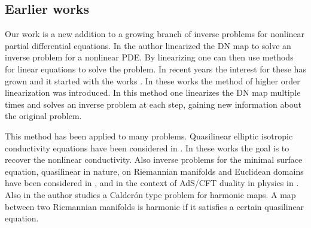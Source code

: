 \documentclass[a4paper, 10pt, twoside, notitlepage]{amsart}
\theoremstyle{plain}
\newcommand{\Om}{\Omega}
\numberwithin{equation}{section}
\begin{document}


\subsection{Earlier works}

Our work is a new addition to a growing branch of inverse problems for nonlinear partial differential equations. In \cite{isakov1993uniqueness} the author linearized the DN map to solve an inverse problem for a nonlinear PDE. By linearizing one can then use methods for linear equations to solve the problem. In recent years the interest for these has grown and it started with the works \cite{kurylev2018inverse,FO19,LLLS2019inverse}. In these works the method of higher order linearization was introduced. In this method one linearizes the DN map multiple times and solves an inverse problem at each step, gaining new information about the original problem.

This method has been applied to many problems. Quasilinear elliptic isotropic conductivity equations have been considered in \cite{CFKKU, kian2020partial, liimatainen2023calder}. In these works the goal is to recover the nonlinear conductivity. Also inverse problems for the minimal surface equation, quasilinear in nature, on Riemannian manifolds and Euclidean domains have been considered in \cite{ABN_20_minimal,carstea2024calderonproblemriemanniansurface,carstea2023inverseproblemgeneralminimal,carstea2024calderonproblemriemanniansurfaces,nurminen2023,Nurminen2024}, and in the context of AdS/CFT duality in physics in \cite{jokela2025bulk}. Also in \cite{muñozthon2024calderonsproblemharmonicmaps} the author studies a Calderón type problem for harmonic maps. A map between two Riemannian manifolds is harmonic if it satisfies a certain quasilinear equation.
\end{document}
